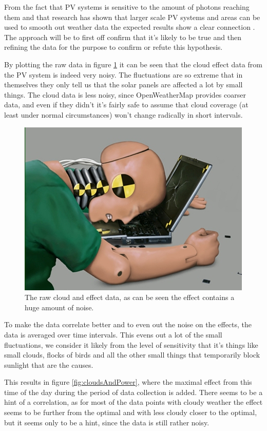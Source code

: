 From the fact that PV systems is sensitive to the amount of photons
reaching them and that research has shown that larger scale PV systems
and areas can be used to smooth out weather data the expected results
show a clear connection \citep{southafrica, cloudTrack, photovoltaic}.
The approach will be to first off confirm that it's likely to be true
and then refining the data for the purpose to confirm or refute this
hypothesis.

By plotting the raw data in figure \ref{fig:noise} it can be seen that
the cloud effect data from the PV system is indeed very noisy.  The
fluctuations are so extreme that in themselves they only tell us that
the solar panels are affected a lot by small things.  The cloud data
is less noisy, since OpenWeatherMap provides coarser data, and even if
they didn't it's fairly safe to assume that cloud coverage (at least
under normal circumstances) won't change radically in short intervals.

\begin{figure}
  \centering
  \includegraphics{dummy.jpg}
  \caption{The raw cloud and effect data, as can be seen the effect
    contains a huge amount of noise.}
  \label{fig:noise}
\end{figure}

To make the data correlate better and to even out the noise on the
effects, the data is averaged over time intervals.  This evens out a
lot of the small fluctuations, we consider it likely from the level of
sensitivity that it's things like small clouds, flocks of birds and
all the other small things that temporarily block sunlight that are
the causes.

This results in figure \ref{fig:cloudsAndPower}, where the maximal
effect from this time of the day during the period of data collection
is added.  There seems to be a hint of a correlation, as for most of
the data points with cloudy weather the effect seems to be further
from the optimal and with less cloudy closer to the optimal, but it
seems only to be a hint, since the data is still rather noisy.

